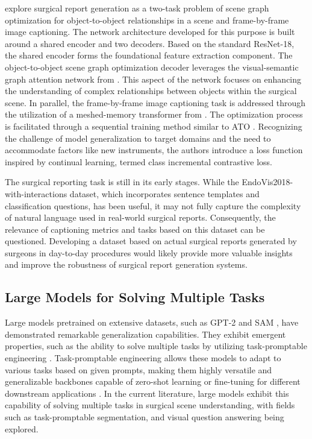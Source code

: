 \citet{mobarakol_task_aware} explore surgical report generation as a two-task problem of scene graph optimization for object-to-object relationships in a scene and frame-by-frame image captioning. The network architecture developed for this purpose is built around a shared encoder and two decoders.
Based on the standard ResNet-18, the shared encoder forms the foundational feature extraction component. The object-to-object scene graph optimization decoder leverages the visual-semantic graph attention network from \citet{9739429}. This aspect of the network focuses on enhancing the understanding of complex relationships between objects within the surgical scene.
In parallel, the frame-by-frame image captioning task is addressed through the utilization of a meshed-memory transformer from \citet{Cornia_2020_CVPR}. 
The optimization process is facilitated through a sequential training method similar to  ATO \citep{islam2020apmtl}. 
Recognizing the challenge of model generalization to target domains and the need to accommodate factors like new instruments, the authors introduce a loss function inspired by continual learning, termed class incremental contrastive loss. 

The surgical reporting task is still in its early stages. While the EndoVis2018-with-interactions dataset, which incorporates sentence templates and classification questions, has been useful, it may not fully capture the complexity of natural language used in real-world surgical reports. Consequently, the relevance of captioning metrics and tasks based on this dataset can be questioned. Developing a dataset based on actual surgical reports generated by surgeons in day-to-day procedures would likely provide more valuable insights and improve the robustness of surgical report generation systems.

\subsection{Large Models for Solving Multiple Tasks}
Large models pretrained on extensive datasets, such as GPT-2 \cite{radford2021learning} and SAM \cite{kirillov2023segment}, have demonstrated remarkable generalization capabilities. They exhibit emergent properties, such as the ability to solve multiple tasks by utilizing task-promptable engineering \cite{radford2019language,kirillov2023segment}. Task-promptable engineering allows these models to adapt to various tasks based on given prompts, making them highly versatile and generalizable backbones capable of zero-shot learning or fine-tuning for different downstream applications \cite{su2024stem}. In the current literature, large models exhibit this capability of solving multiple tasks in surgical scene understanding, with fields such as task-promptable segmentation, and visual question answering being explored.

